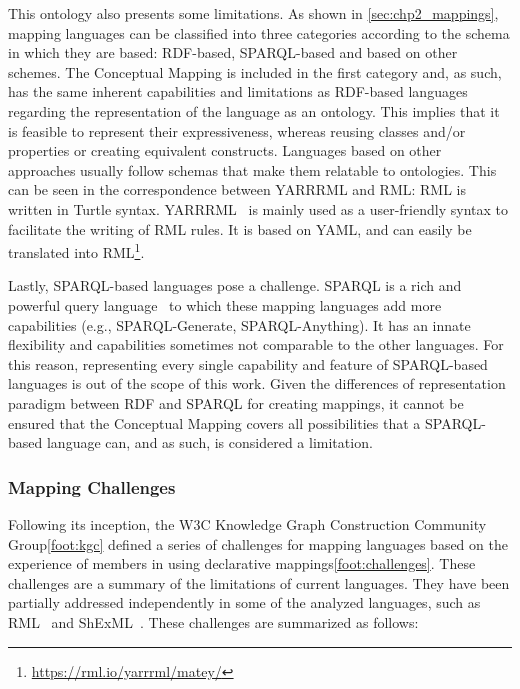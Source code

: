 This ontology also presents some limitations. As shown in \cref{sec:chp2_mappings}, mapping languages can be classified into three categories according to the schema in which they are based: RDF-based, SPARQL-based and based on other schemes. The Conceptual Mapping is included in the first category and, as such, has the same inherent capabilities and limitations as RDF-based languages regarding the representation of the language as an ontology. This implies that it is feasible to represent their expressiveness, whereas reusing classes and/or properties or creating equivalent constructs. Languages based on other approaches usually follow schemas that make them relatable to ontologies. This can be seen in the correspondence between YARRRML and RML: RML is written in Turtle syntax. YARRRML~\cite{Heyvaert2018yarrrml} is mainly used as a user-friendly syntax to facilitate the writing of RML rules. It is based on YAML, and can easily be translated into RML\footnote{\url{https://rml.io/yarrrml/matey/}}. 

Lastly, SPARQL-based languages pose a challenge. SPARQL is a rich and powerful query language~\cite{perez2009semantics} to which these mapping languages add more capabilities (e.g., SPARQL-Generate, SPARQL-Anything). It has an innate flexibility and capabilities sometimes not comparable to the other languages. For this reason, representing every single capability and feature of SPARQL-based languages is out of the scope of this work. Given the differences of representation paradigm between RDF and SPARQL for creating mappings, it cannot be ensured that the Conceptual Mapping covers all possibilities that a SPARQL-based language can, and as such, is considered a limitation.


\subsubsection{Mapping Challenges}
\label{sec:chp4_mapping_challenges}

Following its inception, the W3C Knowledge Graph Construction Community Group\cref{foot:kgc} defined a series of challenges for mapping languages based on the experience of members in using declarative mappings\cref{foot:challenges}. These challenges are a summary of the limitations of current languages. They have been partially addressed independently in some of the analyzed languages, such as RML~\cite{delva2021rml-fields,iglesias2023rml} and ShExML~\cite{garcia2021shexml-challenges}. These challenges are summarized as follows:

